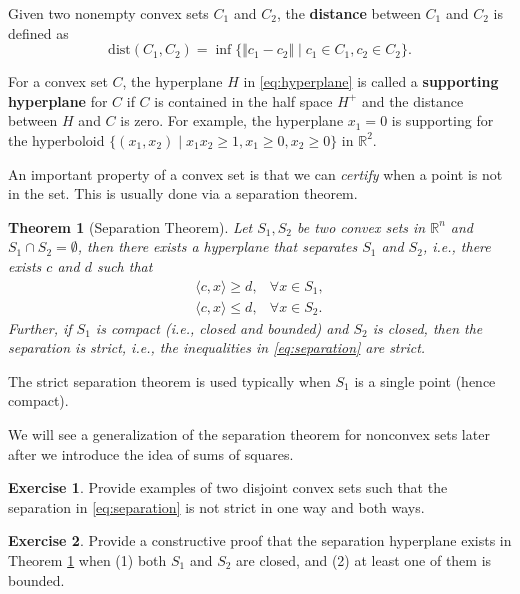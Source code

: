 \documentclass[
]{book}
\newtheorem{theorem}{Theorem}[chapter]
\theoremstyle{definition}
\theoremstyle{definition}
\theoremstyle{definition}
\newtheorem{exercise}{Exercise}[chapter]
\theoremstyle{definition}
\theoremstyle{remark}
\begin{document}
Given two nonempty convex sets \(C_1\) and \(C_2\), the \textbf{distance} between \(C_1\) and \(C_2\) is defined as
\begin{equation}
\mathrm{dist}(C_1,C_2) = \inf \{ \Vert c_1 - c_2 \Vert \mid c_1 \in C_1, c_2 \in C_2 \}.
\end{equation}

For a convex set \(C\), the hyperplane \(H\) in \eqref{eq:hyperplane} is called a \textbf{supporting hyperplane} for \(C\) if \(C\) is contained in the half space \(H^{+}\) and the distance between \(H\) and \(C\) is zero. For example, the hyperplane \(x_1 = 0\) is supporting for the hyperboloid \(\{ (x_1,x_2) \mid x_1 x_2 \geq 1, x_1 \geq 0, x_2 \geq 0 \}\) in \(\mathbb{R}^{2}\).

An important property of a convex set is that we can \emph{certify} when a point is not in the set. This is usually done via a separation theorem.

\begin{theorem}[Separation Theorem]
\protect\hypertarget{thm:SeparationTheorem}{}\label{thm:SeparationTheorem}Let \(S_1,S_2\) be two convex sets in \(\mathbb{R}^{n}\) and \(S_1 \cap S_2 = \emptyset\), then there exists a hyperplane that separates \(S_1\) and \(S_2\), i.e., there exists \(c\) and \(d\) such that
\begin{equation}
\begin{split}
\langle c, x \rangle \geq d, &  \forall x \in S_1,\\
\langle c, x \rangle \leq d, & \forall x \in S_2.
\end{split}
\label{eq:separation}
\end{equation}
Further, if \(S_1\) is compact (i.e., closed and bounded) and \(S_2\) is closed, then the separation is strict, i.e., the inequalities in \eqref{eq:separation} are strict.
\end{theorem}

The strict separation theorem is used typically when \(S_1\) is a single point (hence compact).

We will see a generalization of the separation theorem for nonconvex sets later after we introduce the idea of sums of squares.

\begin{exercise}
Provide examples of two disjoint convex sets such that the separation in \eqref{eq:separation} is not strict in one way and both ways.
\end{exercise}

\begin{exercise}
Provide a constructive proof that the separation hyperplane exists in Theorem \ref{thm:SeparationTheorem} when (1) both \(S_1\) and \(S_2\) are closed, and (2) at least one of them is bounded.
\end{exercise}
\end{document}
